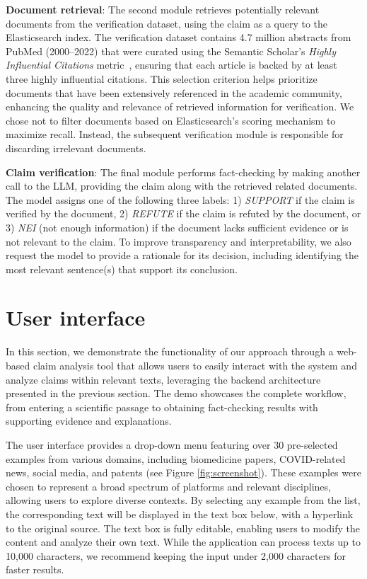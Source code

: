 \documentclass[11pt]{article}
\begin{document}
\textbf{Document retrieval}: The second module retrieves potentially relevant documents from the verification dataset, using the claim as a query to the Elasticsearch index. The verification dataset contains 4.7 million abstracts from PubMed (2000–2022) that were curated using the Semantic Scholar's \textit{Highly Influential Citations} metric~\cite{valenzuela2015identifying}, ensuring that each article is backed by at least three highly influential citations. This selection criterion helps prioritize documents that have been extensively referenced in the academic community, enhancing the quality and relevance of retrieved information for verification. %
We chose not to filter documents based on Elasticsearch's scoring mechanism to maximize recall. Instead, the subsequent verification module is responsible for discarding irrelevant documents.

\textbf{Claim verification}: The final module performs fact-checking by making another call to the LLM, providing the claim along with the retrieved related documents. The model assigns one of the following three labels: 1) \textit{SUPPORT} if the claim is verified by the document, 2) \textit{REFUTE} if the claim is refuted by the document, or 3) \textit{NEI} (not enough information) if the document lacks sufficient evidence or is not relevant to the claim. To improve transparency and interpretability, we also request the model to provide a rationale for its decision, including identifying the most relevant sentence(s) that support its conclusion.

\section{User interface}

\label{sec:demonstration}

In this section, we demonstrate the functionality of our approach through a web-based claim analysis tool that allows users to easily interact with the system and analyze claims within relevant texts, leveraging the backend architecture presented in the previous section. The demo showcases the complete workflow, from entering a scientific passage to obtaining fact-checking results with supporting evidence and explanations. 

The user interface provides a drop-down menu featuring over 30 pre-selected examples from various domains, including biomedicine papers, COVID-related news, social media, and patents (see Figure \ref{fig:screenshot}). These examples were chosen to represent a broad spectrum of platforms and relevant disciplines, allowing users to explore diverse contexts. By selecting any example from the list, the corresponding text will be displayed in the text box below, with a hyperlink to the original source. The text box is fully editable, enabling users to modify the content and analyze their own text.  While the application can process texts up to 10,000 characters, we recommend keeping the input under 2,000 characters for faster results.
\end{document}
